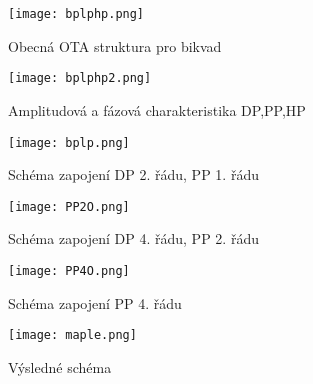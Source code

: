 \begin{figure}[h]
\centering
\texttt{[image: bplphp.png]}
\caption{Obecná OTA struktura pro bikvad\label{s:BIK1}}
\end{figure}
\begin{figure}[h]
\centering
\texttt{[image: bplphp2.png]}
\caption{Amplitudová a fázová charakteristika DP,PP,HP\label{s:BIK2}}
\end{figure}
\begin{figure}[h]
\centering
\texttt{[image: bplp.png]}
\caption{Schéma zapojení DP 2. řádu, PP 1. řádu}
\end{figure}
\begin{figure}[h]
\centering
\texttt{[image: PP2O.png]}
\caption{Schéma zapojení DP 4. řádu, PP 2. řádu \label{s:DP4}}
\end{figure}
\begin{figure}[h]
\centering
\texttt{[image: PP4O.png]}
\caption{Schéma zapojení PP 4. řádu \label{s:PP4}}
\end{figure}
\begin{figure}[h]
\centering
\texttt{[image: maple.png]}
\caption{Výsledné schéma\label{s:V1}}
\end{figure}